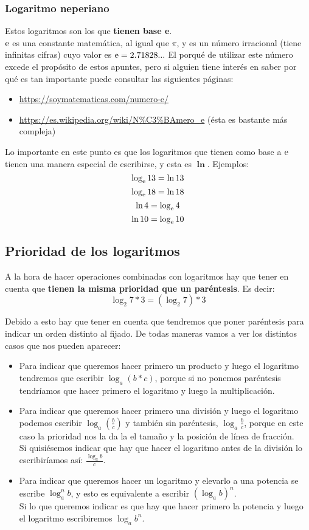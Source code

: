 \documentclass[a4paper,10pt,answers]{exam}
\begin{document}
\subsubsection{Logaritmo neperiano}
Estos logaritmos son los que \textbf{tienen base e}.\\

$\mathrm{e}$ es una constante matemática, al igual que $\pi$, y es un número irracional (tiene infinitas cifras) cuyo valor es $\mathrm{e} = 2.71828...$ El porqué de utilizar este número excede el propósito de estos apuntes, pero si alguien tiene interés en saber por qué es tan importante puede consultar las siguientes páginas:
\begin{itemize}
	\item \url{https://soymatematicas.com/numero-e/}
	\item \url{https://es.wikipedia.org/wiki/N\%C3\%BAmero_e} (ésta es bastante más compleja)
\end{itemize}

Lo importante en este punto es que los logaritmos que tienen como base a $\mathrm{e}$ tienen una manera especial de escribirse, y esta es $\boldsymbol{\ln}$. Ejemplos:
\[\log_{\mathrm{e}} 13 = \ln 13\]
\[\log_{\mathrm{e}} 18 = \ln 18 \]
\[\ln 4 = \log_{\mathrm{e}} 4\]
\[\ln 10 = \log_{\mathrm{e}} 10\]

\subsection{Prioridad de los logaritmos}
A la hora de hacer operaciones combinadas con logaritmos hay que tener en cuenta que \textbf{tienen la misma prioridad que un paréntesis}. Es decir:
\[\log_2 7*3 = \left( \log_2 7 \right) * 3 \]

Debido a esto hay que tener en cuenta que tendremos que poner paréntesis para indicar un orden distinto al fijado. De todas maneras vamos a ver los distintos casos que nos pueden aparecer:
\begin{itemize}
	\item Para indicar que queremos hacer primero un producto y luego el logaritmo tendremos que escribir $\log_a (b*c)$, porque si no ponemos paréntesis tendríamos que hacer primero el logaritmo y luego la multiplicación.
	\item Para indicar que queremos hacer primero una división y luego el logaritmo podemos escribir $\log_a \left(\frac{b}{c} \right)$ y también sin paréntesis, $\log_a \frac{b}{c}$, porque en este caso la prioridad nos la da la el tamaño y la posición de línea de fracción.\\
	Si quisiésemos indicar que hay que hacer el logaritmo antes de la división lo escribiríamos así: $\frac{\log_a b}{c}$.
	\item Para indicar que queremos hacer un logaritmo y elevarlo a una potencia se escribe $\log_a^n b$, y esto es equivalente a escribir $\left( \log_a b \right)^n$.\\
	Si lo que queremos indicar es que hay que hacer primero la potencia y luego el logaritmo escribiremos $\log_a b^n$.
\end{itemize}
\end{document}
